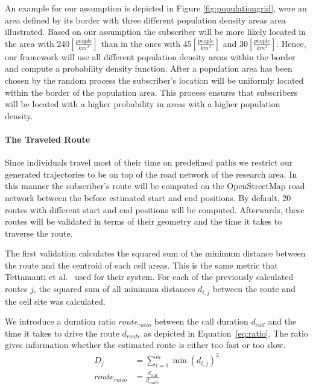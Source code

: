 \documentclass[twocolumn]{bmcart}%
\begin{document}
An example for our assumption is depicted in Figure \ref{fig:populationgrid}, were an area defined by its border with three different population density areas area illustrated. Based on our assumption the subscriber will be more likely located in the area with 240$[\frac{people}{km^2}]$ than in the ones with 45$[\frac{people}{km^2}]$ and 30$[\frac{people}{km^2}]$. Hence, our framework will use all different population density areas within the border and compute a probability density function. After a population area has been chosen by the random process the subscriber's location will be uniformly located within the border of the population area. This process ensures that subscribers will be located with a higher probability in areas with a higher population density.
\paragraph{The Traveled Route}
Since individuals travel most of their time on predefined paths we restrict our generated trajectories to be on top of the road network of the research area. In this manner the subscriber's route will be computed on the OpenStreetMap road network between the before estimated start and end positions. By default, 20 routes with different start and end positions will be computed. Afterwards, these routes will be validated in terms of their geometry and the time it takes to traverse the route.

The first validation calculates the squared sum of the minimum distance between the route and the centroid of each cell areas. This is the same metric that Tettamanti et al.~\cite{Tettamanti2012} used for their system. For each of the previously calculated routes $j$, the squared sum of all minimum distances $d_{i,j}$ between the
route and the cell site was calculated.

We introduce a duration ratio $route_{ratio}$ between the call duration $d_{call}$ and the time it takes to drive the route $d_{route}$ as depicted in Equation~\ref{eq:ratio}. The ratio gives information whether the estimated route is either too fast or too slow. 
\begin{align}
	D_j           & =\sum_{i=1}^{m} \min(d_{i,j})^{2} \label{eq:sumsquaremine} \\
	route_{ratio} & =\frac{d_{call}}{d_{route}} \label{eq:ratio}               
\end{align} 
\end{document}
